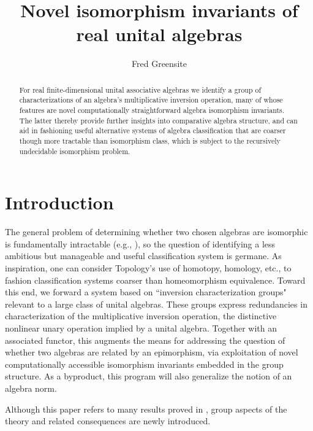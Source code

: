 \documentclass{amsart}
\numberwithin{equation}{section}
\theoremstyle{definition}
\numberwithin{theorem}{section}
\begin{document}
       
             \title{Novel isomorphism invariants of real unital algebras}
    \author{Fred Greensite}
    
   \begin{abstract}  For real finite-dimensional unital associative algebras we identify a group of characterizations of an algebra's multiplicative inversion operation, many of whose features are novel computationally straightforward algebra isomorphism invariants.  The latter thereby provide further insights into comparative algebra structure, and can aid in fashioning useful alternative systems of algebra classification that are coarser though more tractable than isomorphism class, which is subject to the recursively undecidable isomorphism problem.
   \end{abstract}
        
  \maketitle
  
 
  \section{Introduction} The general problem of determining whether two chosen algebras are isomorphic is fundamentally intractable (e.g., \cite{drozd:1972,prest:1991,belitskii:2003}), so the question of identifying a  less ambitious but manageable and useful classification system is germane.  As inspiration, one can consider Topology's use of homotopy, homology, etc., to fashion classification systems coarser than homeomorphism equivalence.  Toward this end, we forward a system based on  ``inversion characterization groups" relevant to a large class of unital algebras.  These groups express redundancies in characterization of the multiplicative inversion operation, the distinctive nonlinear unary operation implied by a unital algebra. Together with an associated functor, this augments the means for addressing the question of whether two algebras are related by an epimorphism, via exploitation of novel computationally accessible isomorphism invariants embedded in the group structure.
    As a byproduct, this program will also generalize the notion of an algebra norm.
  
  Although this paper refers to many results proved in \cite{fgreensite:2023}, group aspects of the theory and related consequences are newly introduced.
   
\end{document}
